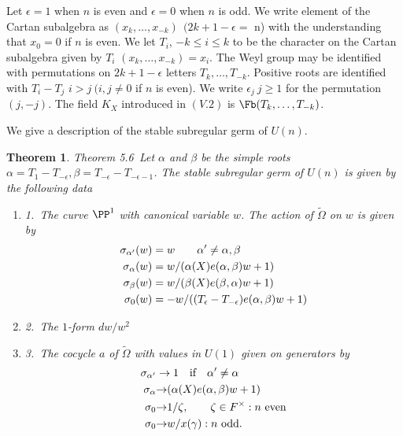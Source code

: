 \documentclass{memo-l}
\newtheorem{theorem}{Theorem}[section]
\theoremstyle{definition}
\theoremstyle{remark}
\numberwithin{section}{chapter}
\numberwithin{equation}{chapter}
\begin{document}
   Let ${\epsilon}  =  1$ when $n$ is even and ${\epsilon}  =  0$ when $n$ is
odd.  We write element of the Cartan subalgebra as $(x_{k},\ldots ,x_{-k})
\ \ (2k+1-{\epsilon}  = $ n) with the understanding that $x_{0}  =  0$ if $n$ is
even.  We let $T_{i}$, $-k  \le i  \le k$ to be the character on the
Cartan subalgebra given by $T_{i}$ $(x_{k},\ldots ,x_{-k})  =  x_{i}$.  The Weyl
group may be identified with permutations on $2k+1-{\epsilon}$ letters
$T_{k},\ldots ,T_{-k}$.  Positive roots are identified with $T_{i}-T_{j}$
 $i > j\  (i,j  \ne  0$ if $n$ is even).  We write ${\epsilon}_{j}\
 j \ge  1$ for
the permutation $(j,-j)$.  The field $K_X$ introduced in $(V.2)$ is $\Fb
(T_{k},\ldots ,T_{-k})$.

   We give a description of the stable subregular germ of $U(n)$.


\begin{theorem}{Theorem 5.6}\ Let ${\alpha}$ and ${\beta}$ be the simple
roots ${\alpha}  =  T_{1}-T_{-{\epsilon}}, {\beta}  = 
T_{-{\epsilon}}-T_{-{\epsilon}-1}$.  The stable subregular germ of $U(n)$
is given by the following data
        \begin{enumerate}
\item{1.}\  The curve ${\PP}^1$ with canonical variable $w$.  The
action of $\tilde{\Omega}$ on $w$ is given by
$$
\aligned
{\sigma}_{{\alpha}'}(w)  &=  w \qquad {\alpha}' \ne  {\alpha},{\beta} \\
{\sigma}_{{\alpha}}(w)  &=  w/({\alpha}(X)e({\alpha},{\beta})w + 1) \\
{\sigma}_{{\beta}}(w)  &=  w/({\beta}(X)e({\beta},{\alpha})w + 1) \\
{\sigma}_{0}(w)  &= 
-w/((T_{{\epsilon}}-T_{-{\epsilon}})e({\alpha},{\beta})w + 1) 
\endaligned
$$
\item{2.}\  The $1$-form $dw/w^{2}$
\item{3.}\  The cocycle $a$ of $\tilde{\Omega}$ with values in $U(1)$ given on
generators by 
$$
\aligned
\sigma_{\alpha'} &\to 1 \quad \hbox{if}\quad \alpha'\ne\alpha\\
{\sigma}_{{\alpha}} &{\to} ({\alpha}(X)e({\alpha},{\beta})w + 1)\\
{\sigma}_{0} &{\to} 1/{\zeta}, \qquad {\zeta}  \in  F^{\times} : n\ {\text{even}}\\
{\sigma}_{0} &{\to} w/x({\gamma}) : n\ {\text{odd}}.
\endaligned
$$
\end{enumerate}
\end{theorem}
\end{document}
